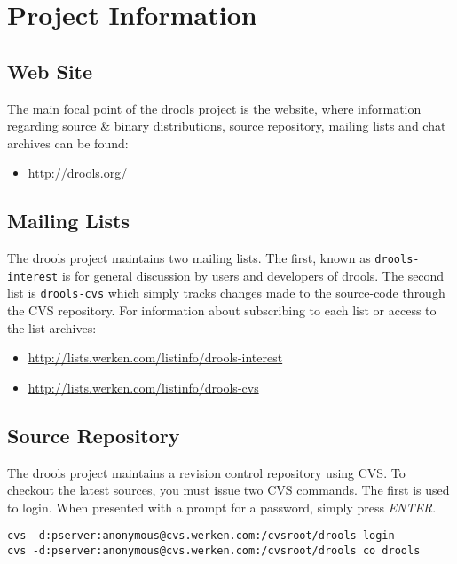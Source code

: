 \chapter{Project Information}


\section{Web Site}

The main focal point of the drools project is the website, where
information regarding source \& binary distributions, source
repository, mailing lists and chat archives can be found:

\begin{itemize}
    \item \url{http://drools.org/}
\end{itemize}

\section{Mailing Lists}

The drools project maintains two mailing lists.  The first, known as
\verb|drools-interest| is for general discussion by users and
developers of drools.  The second list is \verb|drools-cvs| which
simply tracks changes made to the source-code through the CVS
repository. For information about subscribing to each list or access 
to the list archives:

\begin{itemize}
    \item \url{http://lists.werken.com/listinfo/drools-interest}
    \item \url{http://lists.werken.com/listinfo/drools-cvs}
\end{itemize}

\section{Source Repository}

The drools project maintains a revision control repository using
CVS.  To checkout the latest sources, you must issue two CVS commands.
The first is used to login.  When presented with a prompt for a
password, simply press \emph{ENTER}.

\begin{verbatim}
cvs -d:pserver:anonymous@cvs.werken.com:/cvsroot/drools login
cvs -d:pserver:anonymous@cvs.werken.com:/cvsroot/drools co drools
\end{verbatim}

